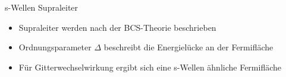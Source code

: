 \begin{frame}{s-Wellen Supraleiter}
    \begin{itemize}
        \item Supraleiter werden nach der BCS-Theorie beschrieben
        \item Ordnungsparameter $\Delta$ beschreibt die Energielücke an der Fermifläche
        \item Für Gitterwechselwirkung ergibt sich eine s-Wellen ähnliche Fermifläche
    \end{itemize}
    \begin{columns}

\end{columns}
\end{frame}
